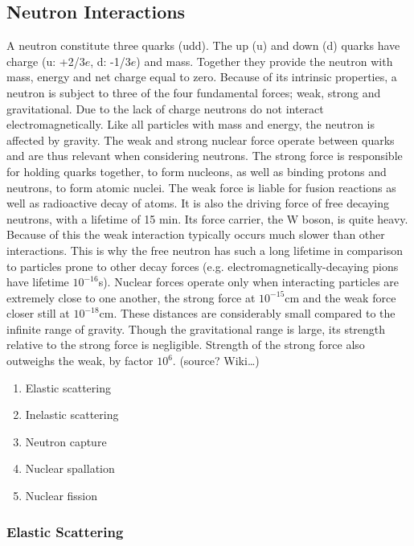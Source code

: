 \subsection{Neutron Interactions}

A neutron constitute three quarks (udd). The up (u) and down (d) quarks have charge (u: +2/3$e$, d: -1/3$e$) and mass. Together they provide the neutron with mass, energy and net charge equal to zero. Because of its intrinsic properties, a neutron is subject to three of the four fundamental forces; weak, strong and gravitational. Due to the lack of charge neutrons do not interact electromagnetically.
Like all particles with mass and energy, the neutron is affected by gravity. The weak and strong nuclear force operate between quarks and are thus relevant when considering neutrons. The strong force is responsible for holding quarks together, to form nucleons, as well as binding protons and neutrons, to form atomic nuclei. The weak force is liable for fusion reactions as well as radioactive decay of atoms. It is also the driving force of free decaying neutrons, with a lifetime of 15 min. Its force carrier, the W boson, is quite heavy. Because of this the weak interaction typically occurs much slower than other interactions. This is why the free neutron has such a long lifetime in comparison to particles prone to other decay forces (e.g. electromagnetically-decaying pions have lifetime $10^{-16}$s).
Nuclear forces operate only when interacting particles are extremely close to one another, the strong force at $10^{-15}$cm and the weak force closer still at $10^{-18}$cm. These distances are considerably small compared to the infinite range of gravity. Though the gravitational range is large, its strength relative to the strong force is negligible. Strength of the strong force also outweighs the weak, by factor $10^6$. (source? Wiki…)
    \begin{enumerate}[noitemsep]
      \item Elastic scattering
      \item Inelastic scattering
      \item Neutron capture
      \item Nuclear spallation
      \item Nuclear fission
    \end{enumerate}

\subsubsection{Elastic Scattering}

